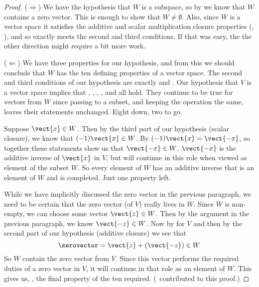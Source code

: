 \begin{proof}
($\Rightarrow$)  We have the hypothesis that $W$ is a subspace, so by  we know that $W$ contains a zero vector.  This is enough to show that $W\neq\emptyset$.  Also, since $W$ is a vector space it satisfies the additive and scalar multiplication closure properties (, ), and so exactly meets the second and third conditions.  If that was easy, the the other direction might require a bit more work.\par
%
($\Leftarrow$) We have three properties for our hypothesis, and from this we should conclude that $W$ has the ten defining properties of a vector space.  The second and third conditions of our hypothesis are exactly  and .
Our hypothesis that $V$ is a vector space implies that
,
,
,
,
 and
all hold.  They continue to be true for vectors from $W$ since passing to a subset, and keeping the operation the same, leaves their statements unchanged.  Eight down, two to go.\par
%
Suppose $\vect{x}\in W$.  Then by the third part of our hypothesis (scalar closure), we know that $(-1)\vect{x}\in W$.  By  $(-1)\vect{x}=\vect{-x}$, so together these statements show us that $\vect{-x}\in W$.  $\vect{-x}$ is the additive inverse of $\vect{x}$ in $V$, but will continue in this role when viewed as element of the subset $W$.  So every element of $W$ has an additive inverse that is an element of $W$ and  is completed.  Just one property left.\par
%
While we have implicitly discussed the zero vector in the previous paragraph, we need to be certain that the zero vector (of $V$) really lives in $W$.   Since $W$ is non-empty, we can choose some vector $\vect{z}\in W$.  Then by the argument in the previous paragraph, we know $\vect{-z}\in W$.  Now by  for $V$ and then by the second part of our hypothesis (additive closure) we see that
%
\begin{equation*}
\zerovector=\vect{z}+(\vect{-z})\in W
\end{equation*}
%
So $W$ contain the zero vector from $V$.  Since this vector performs the required duties of a zero vector in $V$, it will continue in that role as an element of $W$. This gives us, , the final property of the ten required.  (\sarahfellez\ contributed to this proof.)\par
%
\end{proof}
